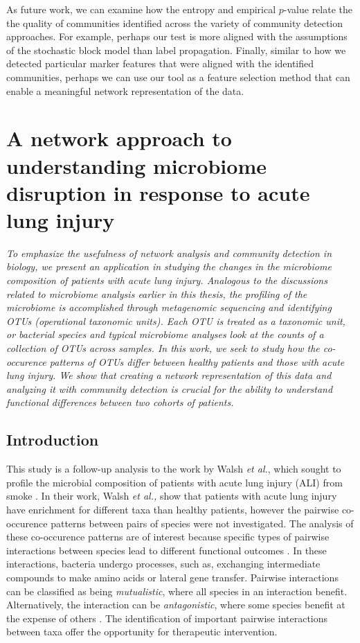 As future work, we can examine how the entropy and empirical $p$-value relate the the quality of communities identified across the variety of community detection approaches. For example, perhaps our test is more aligned with the assumptions of the stochastic block model than label propagation. Finally, similar to how we detected particular marker features that were aligned with the identified communities, perhaps we can use our tool as a feature selection method that can enable a meaningful network representation of the data. 


\chapter{A network approach to understanding microbiome disruption in response to acute lung injury}

\noindent{}

\emph{To emphasize the usefulness of network analysis and community detection in biology, we present an application in studying the changes in the microbiome composition of patients with acute lung injury. Analogous to the discussions related to microbiome analysis earlier in this thesis, the profiling of the microbiome is accomplished through metagenomic sequencing and identifying OTUs (operational taxonomic units). Each OTU is treated as a taxonomic unit, or bacterial species and typical microbiome analyses look at the counts of a collection of OTUs across samples. In this work, we seek to study how the co-occurence patterns of OTUs differ between healthy patients and those with acute lung injury. We show that creating a network representation of this data and analyzing it with community detection is crucial for the ability to understand functional differences between two cohorts of patients.}

\section{Introduction}
 This study is a follow-up analysis to the work by Walsh \emph{et al.}, which sought to profile the microbial composition of patients with acute lung injury (ALI) from smoke \cite{walsh2017}. In their work, Walsh \emph{et al.,} show that patients with acute lung injury have enrichment for different taxa than healthy patients, however the pairwise co-occurence patterns between pairs of species were not investigated. The analysis of these co-occurence patterns are of interest because specific types of pairwise interactions between species lead to different functional outcomes \cite{boon}.  In these interactions, bacteria undergo processes, such as, exchanging intermediate compounds to make amino acids or lateral gene transfer. Pairwise interactions can be classified as being \emph{mutualistic}, where all species in an interaction benefit. Alternatively, the interaction can be \emph{antagonistic}, where some species benefit at the expense of others \cite{mutualism}. The identification of important pairwise interactions between taxa offer the opportunity for therapeutic intervention.  
 
